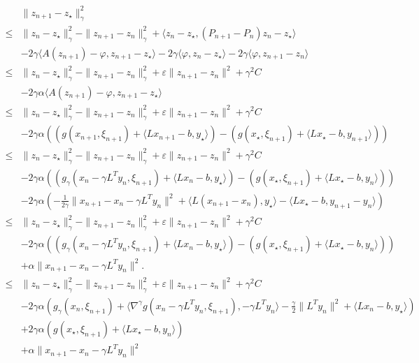 \documentclass{article}
\newcommand{\ps}[1]{\langle #1 \rangle}
\theoremstyle{definition}
\begin{document}
\begin{align*}
&\|z_{n+1} - z_\star\|_\gamma^2 \\
\leq &\|z_{n} - z_\star\|_\gamma^2 - \|z_{n+1} - z_{n}\|_\gamma^2 + \ps{z_n - z_\star,(P_{n+1} - P_n)z_n - z_\star}\\
& -2\gamma \ps{A(z_{n+1}) - \varphi,z_{n+1} - z_\star} -2\gamma \ps{\varphi,z_{n} - z_\star} -2\gamma \ps{\varphi,z_{n+1} - z_n}\\
\leq &\|z_{n} - z_\star\|_\gamma^2 - \|z_{n+1} - z_{n}\|_\gamma^2 +  \varepsilon \|z_{n+1} - z_{n}\|^2 + \gamma^2 C\\
& -2\gamma \alpha \ps{A(z_{n+1}) - \varphi,z_{n+1} - z_\star} \\
\leq &\|z_{n} - z_\star\|_\gamma^2 - \|z_{n+1} - z_{n}\|_\gamma^2 +  \varepsilon \|z_{n+1} - z_{n}\|^2 + \gamma^2 C\\
& -2\gamma\alpha \left(( g(x_{n+1},\xi_{n+1}) + \ps{L x_{n+1} - b,y_\star} ) - ( g(x_\star,\xi_{n+1}) + \ps{L x_\star - b,y_{n+1}} )\right)\\
\leq &\|z_{n} - z_\star\|_\gamma^2 - \|z_{n+1} - z_{n}\|_\gamma^2 +  \varepsilon \|z_{n+1} - z_{n}\|^2 + \gamma^2 C\\
& -2\gamma\alpha \left(( g_\gamma(x_{n} - \gamma L^T y_{n},\xi_{n+1}) + \ps{L x_{n}-b,y_\star} ) - ( g(x_\star,\xi_{n+1}) + \ps{L x_\star-b,y_{n}} )\right)\\
& -2\gamma\alpha \left(-\frac{1}{2\gamma}\|x_{n+1} - x_n - \gamma L^T y_n\|^2 + \ps{L (x_{n+1} - x_n),y_\star} - \ps{L x_\star - b,y_{n+1} - y_n}\right)\\
\leq &\|z_{n} - z_\star\|_\gamma^2 - \|z_{n+1} - z_{n}\|_\gamma^2 + \varepsilon \|z_{n+1} - z_{n}\|^2 + \gamma^2 C \\
& -2\gamma\alpha \left(( g_\gamma(x_{n} - \gamma L^T y_{n},\xi_{n+1}) + \ps{L x_{n}-b,y_\star} ) - ( g(x_\star,\xi_{n+1}) + \ps{L x_\star-b,y_{n}} )\right)\\
& + \alpha\|x_{n+1} - x_n - \gamma L^T y_n\|^2.\\
\leq &\|z_{n} - z_\star\|_\gamma^2 - \|z_{n+1} - z_{n}\|_\gamma^2 + \varepsilon \|z_{n+1} - z_{n}\|^2 + \gamma^2 C \\
& -2\gamma\alpha \left( g_\gamma(x_{n},\xi_{n+1}) + \ps{\nabla^\gamma g(x_n-\gamma L^T y_n,\xi_{n+1}), -\gamma L^T y_n} - \frac{\gamma}{2}\|L^T y_n\|^2 + \ps{L x_{n}-b,y_\star} \right) \\
& +2\gamma \alpha \left( g(x_\star,\xi_{n+1}) + \ps{L x_\star -b,y_{n}} \right)\\
& + \alpha\|x_{n+1} - x_n - \gamma L^T y_n\|^2\\

\end{align*}
\end{document}
